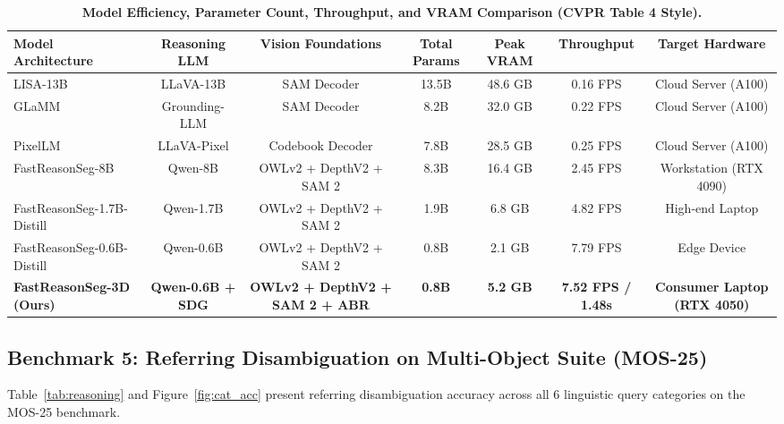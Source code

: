 \documentclass[10pt,twocolumn,letterpaper]{article}
\begin{document}
\begin{table}[t]
\centering
\small
\caption{\textbf{Model Efficiency, Parameter Count, Throughput, and VRAM Comparison (CVPR Table 4 Style).}}
\label{tab:efficiency}
\begin{tabular*}{\textwidth}{@{\extracolsep{\fill}}lcccccc}
\toprule
\textbf{Model Architecture} & \textbf{Reasoning LLM} & \textbf{Vision Foundations} & \textbf{Total Params} & \textbf{Peak VRAM} & \textbf{Throughput} & \textbf{Target Hardware} \\
\midrule
LISA-13B~\cite{lai2023lisa} & LLaVA-13B & SAM Decoder & 13.5B & 48.6 GB & 0.16 FPS & Cloud Server (A100) \\
GLaMM~\cite{rasheed2024glamm} & Grounding-LLM & SAM Decoder & 8.2B & 32.0 GB & 0.22 FPS & Cloud Server (A100) \\
PixelLM~\cite{ren2024pixellm} & LLaVA-Pixel & Codebook Decoder & 7.8B & 28.5 GB & 0.25 FPS & Cloud Server (A100) \\
FastReasonSeg-8B~\cite{shen2026fast} & Qwen-8B & OWLv2 + DepthV2 + SAM 2 & 8.3B & 16.4 GB & 2.45 FPS & Workstation (RTX 4090) \\
FastReasonSeg-1.7B-Distill~\cite{shen2026fast} & Qwen-1.7B & OWLv2 + DepthV2 + SAM 2 & 1.9B & 6.8 GB & 4.82 FPS & High-end Laptop \\
FastReasonSeg-0.6B-Distill~\cite{shen2026fast} & Qwen-0.6B & OWLv2 + DepthV2 + SAM 2 & 0.8B & 2.1 GB & 7.79 FPS & Edge Device \\
\midrule
\textbf{FastReasonSeg-3D (Ours)} & \textbf{Qwen-0.6B + SDG} & \textbf{OWLv2 + DepthV2 + SAM 2 + ABR} & \textbf{0.8B} & \textbf{5.2 GB} & \textbf{7.52 FPS / 1.48s} & \textbf{Consumer Laptop (RTX 4050)} \\
\bottomrule
\end{tabular*}
\end{table}

\subsection{Benchmark 5: Referring Disambiguation on Multi-Object Suite (MOS-25)}
Table~\ref{tab:reasoning} and Figure~\ref{fig:cat_acc} present referring disambiguation accuracy across all 6 linguistic query categories on the MOS-25 benchmark.
\end{document}
